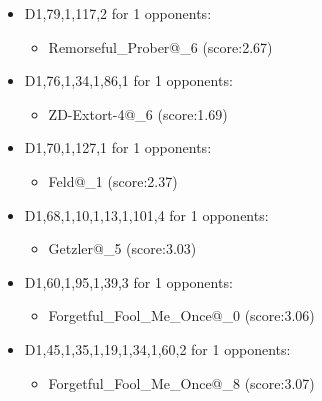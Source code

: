 \begin{appendices}
\begin{itemize}
        \item D1,79,1,117,2 for 1 opponents:
        \begin{multicols}{3}
            \begin{itemize}
                \item Remorseful\_Prober@\_6 (score:2.67)
            \end{itemize}
        \end{multicols}

        \item D1,76,1,34,1,86,1 for 1 opponents:
        \begin{multicols}{3}
            \begin{itemize}
                \item ZD-Extort-4@\_6 (score:1.69)
            \end{itemize}
        \end{multicols}

        \item D1,70,1,127,1 for 1 opponents:
        \begin{multicols}{3}
            \begin{itemize}
                \item Feld@\_1 (score:2.37)
            \end{itemize}
        \end{multicols}

        \item D1,68,1,10,1,13,1,101,4 for 1 opponents:
        \begin{multicols}{3}
            \begin{itemize}
                \item Getzler@\_5 (score:3.03)
            \end{itemize}
        \end{multicols}

        \item D1,60,1,95,1,39,3 for 1 opponents:
        \begin{multicols}{3}
            \begin{itemize}
                \item Forgetful\_Fool\_Me\_Once@\_0 (score:3.06)
            \end{itemize}
        \end{multicols}

        \item D1,45,1,35,1,19,1,34,1,60,2 for 1 opponents:
        \begin{multicols}{3}
            \begin{itemize}
                \item Forgetful\_Fool\_Me\_Once@\_8 (score:3.07)
            \end{itemize}
        \end{multicols}


\end{itemize}
\end{appendices}
